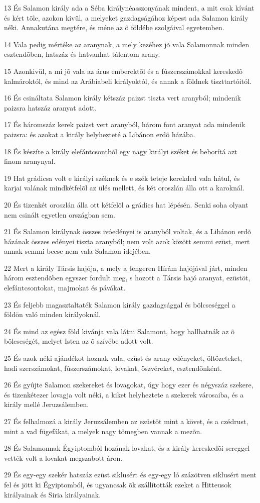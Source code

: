 \par 13 És Salamon király ada a Séba királynéasszonyának mindent, a mit csak kívánt és kért tõle, azokon kivül, a melyeket gazdagságához képest ada Salamon király néki. Annakutána megtére, és méne az õ földébe szolgáival egyetemben.
\par 14 Vala pedig mértéke az aranynak, a mely kezéhez jõ vala Salamonnak minden esztendõben, hatszáz és hatvanhat tálentom arany.
\par 15 Azonkivül, a mi jõ vala az árus emberektõl és a fûszerszámokkal kereskedõ kalmároktól, és mind az Arábiabeli királyoktól, és annak a földnek tiszttartóitól.
\par 16 És csináltata Salamon király kétszáz paizst tiszta vert aranyból; mindenik paizsra hatszáz aranyat adott.
\par 17 És háromszáz kerek paizst vert aranyból, három font aranyat ada mindenik paizsra: és azokat a király helyhezteté a Libánon erdõ házába.
\par 18 És készíte a király elefántcsontból egy nagy királyi széket és beborítá azt finom aranynyal.
\par 19 Hat grádicsa volt e királyi széknek és e szék teteje kerekded vala hátul, és karjai valának mindkétfelõl az ülés mellett, és két oroszlán álla ott a karoknál.
\par 20 És tizenkét oroszlán álla ott kétfelõl a grádics hat lépésén. Senki soha olyant nem csinált egyetlen országban sem.
\par 21 És Salamon királynak összes ivóedényei is aranyból voltak, és a Libánon erdõ házának összes edényei tiszta aranyból; nem volt azok között semmi ezüst, mert annak semmi becse nem vala Salamon idejében.
\par 22 Mert a király Társis hajója, a mely a tengeren Hírám hajójával járt, minden három esztendõben egyszer fordult meg, s hozott a Társis hajó aranyat, ezüstöt, elefántcsontokat, majmokat és pávákat.
\par 23 És feljebb magasztaltaték Salamon király gazdagsággal és bölcseséggel a földön való minden királyoknál.
\par 24 És mind az egész föld kivánja vala látni Salamont, hogy hallhatnák az õ bölcseségét, melyet Isten az õ szívébe adott volt.
\par 25 És azok néki ajándékot hoznak vala, ezüst és arany edényeket, öltözeteket, hadi szerszámokat, fûszerszámokat, lovakat, öszvéreket, esztendõnként.
\par 26 És gyûjte Salamon szekereket és lovagokat, úgy hogy ezer és négyszáz szekere, és tizenkétezer lovagja volt néki, a kiket helyheztete a szekerek városaiba, és a király mellé Jeruzsálemben.
\par 27 És felhalmozá a király Jeruzsálemben az ezüstöt mint a követ, és a czédrust, mint a vad fügefákat, a melyek nagy tömegben vannak a mezõn.
\par 28 És Salamonnak Égyiptomból hozának lovakat, és a király kereskedõi sereggel vették volt a lovakat megszabott áron.
\par 29 És egy-egy szekér hatszáz ezüst siklusért és egy-egy ló százötven siklusért ment fel és jött ki Égyiptomból, és ugyancsak õk szállították ezeket a Hitteusok királyainak és Siria királyainak.

